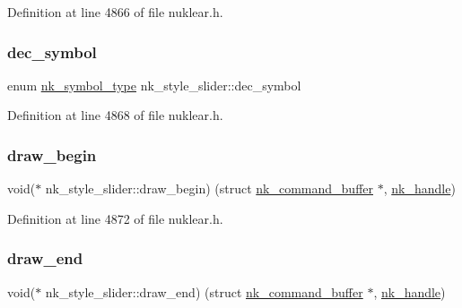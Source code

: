 Definition at line 4866 of file nuklear.\+h.

\mbox{\label{structnk__style__slider_a4974ffb84ecb0c34afc3b608e34bc339}} 
\subsubsection{\texorpdfstring{dec\+\_\+symbol}{dec\_symbol}}
{\footnotesize\ttfamily enum \mbox{\hyperlink{nuklear_8h_a29b4aaa400d0ce28aea3c8c9c372ac07}{nk\+\_\+symbol\+\_\+type}} nk\+\_\+style\+\_\+slider\+::dec\+\_\+symbol}



Definition at line 4868 of file nuklear.\+h.

\mbox{\label{structnk__style__slider_a32d89881002446f40c03ff457a400bc5}} 
\subsubsection{\texorpdfstring{draw\+\_\+begin}{draw\_begin}}
{\footnotesize\ttfamily void($\ast$ nk\+\_\+style\+\_\+slider\+::draw\+\_\+begin) (struct \mbox{\hyperlink{structnk__command__buffer}{nk\+\_\+command\+\_\+buffer}} $\ast$, \mbox{\hyperlink{unionnk__handle}{nk\+\_\+handle}})}



Definition at line 4872 of file nuklear.\+h.

\mbox{\label{structnk__style__slider_a821c8a395eb26c6bd6089d75fc197881}} 
\subsubsection{\texorpdfstring{draw\+\_\+end}{draw\_end}}
{\footnotesize\ttfamily void($\ast$ nk\+\_\+style\+\_\+slider\+::draw\+\_\+end) (struct \mbox{\hyperlink{structnk__command__buffer}{nk\+\_\+command\+\_\+buffer}} $\ast$, \mbox{\hyperlink{unionnk__handle}{nk\+\_\+handle}})}



